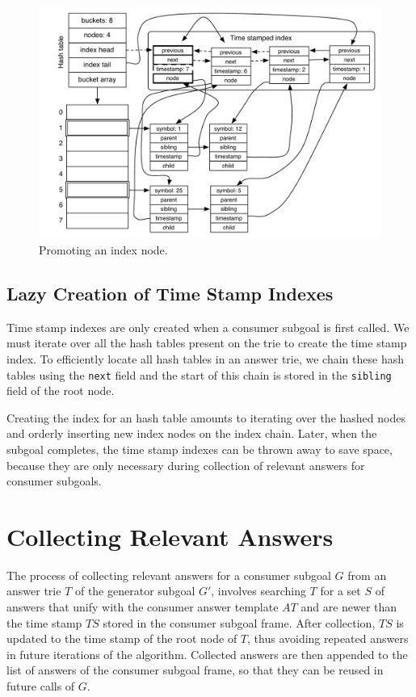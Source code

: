 \begin{figure}[ht]
  \centering
    \includegraphics[scale=0.6]{hash_table_promote.pdf}
  \caption{Promoting an index node.}
  \label{fig:hash_table_promote}
\end{figure}

\subsection{Lazy Creation of Time Stamp Indexes}

Time stamp indexes are only created when a consumer subgoal is first called.
We must iterate over all the hash tables present on the trie to create the time stamp index.
To efficiently locate all hash tables in an answer trie, we chain these hash tables
using the \texttt{next} field and the start of this chain is stored
in the \texttt{sibling} field of the root node.

Creating the index for an hash table amounts to iterating over the hashed nodes
and orderly inserting new index nodes on the index chain.
Later, when the subgoal completes, the time stamp indexes can be thrown away to save space,
because they are only necessary during collection of relevant answers for consumer subgoals.

\section{Collecting Relevant Answers}\label{sec:collect}

The process of collecting relevant answers for a consumer subgoal $G$ from an answer trie $T$
of the generator subgoal $G'$, involves searching $T$ for a set $S$ of answers that unify
with the consumer answer template $AT$ and are newer than the time stamp
$TS$ stored in the consumer subgoal frame. After collection, $TS$ is updated to the
time stamp of the root node of $T$, thus avoiding repeated answers in future iterations
of the algorithm. Collected answers are then appended to the list of answers of the consumer
subgoal frame, so that they can be reused in future calls of $G$.


